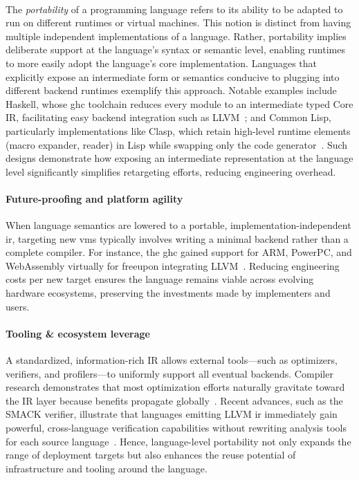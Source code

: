 	\paragraph{}%
  		The \emph{portability} of a programming language refers to its ability to be adapted to run on different runtimes or virtual machines. This notion is distinct from having multiple independent implementations of a language. Rather, portability implies deliberate support at the language's syntax or semantic level, enabling runtimes to more easily adopt the language's core implementation. Languages that explicitly expose an intermediate form or semantics conducive to plugging into different backend runtimes exemplify this approach. Notable examples include Haskell, whose \gls{ghc} toolchain reduces every module to an intermediate typed Core IR, facilitating easy backend integration such as LLVM~\cite{ghc_llvm_backend}; and Common Lisp, particularly implementations like Clasp, which retain high-level runtime elements (macro expander, reader) in Lisp while swapping only the code generator~\cite{clasp_llvm}. Such designs demonstrate how exposing an intermediate representation at the language level significantly simplifies retargeting efforts, reducing engineering overhead.


	\paragraph{Future-proofing and platform agility}%
		When language semantics are lowered to a portable, implementation-independent \gls{ir}, targeting new \glspl{vm} typically involves writing a minimal backend rather than a complete compiler. For instance, the \gls{ghc} gained support for ARM, PowerPC, and WebAssembly virtually \smartQL for free\smartQR upon integrating LLVM~\cite{ghc_llvm_backend}. Reducing engineering costs per new target ensures the language remains viable across evolving hardware ecosystems, preserving the investments made by implementers and users.

	\paragraph{Tooling \& ecosystem leverage}%
		A standardized, information-rich IR allows external tools—such as optimizers, verifiers, and profilers—to uniformly support all eventual backends. Compiler research demonstrates that most optimization efforts naturally gravitate toward the IR layer because benefits propagate globally~\cite{ir_cacm}. Recent advances, such as the SMACK verifier, illustrate that languages emitting LLVM \gls{ir} immediately gain powerful, cross-language verification capabilities without rewriting analysis tools for each source language~\cite{llvm_verification}. Hence, language-level portability not only expands the range of deployment targets but also enhances the reuse potential of infrastructure and tooling around the language.

